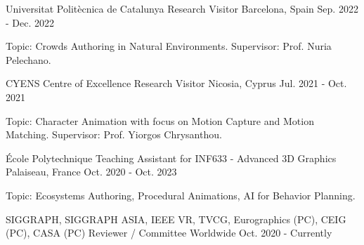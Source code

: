 

\begin{cventries}

\cventry
    {Universitat Politècnica de Catalunya} %
    {Research Visitor} %
    {Barcelona, Spain} %
    {Sep. 2022 - Dec. 2022} %
    {
      \begin{cvitemone} %
        \item {Topic: Crowds Authoring in Natural Environments. Supervisor: Prof. Nuria Pelechano.}
      \end{cvitemone}
    }

  \cventry
    {CYENS Centre of Excellence} %
    {Research Visitor} %
    {Nicosia, Cyprus} %
    {Jul. 2021 - Oct. 2021} %
    {
      \begin{cvitemone} %
        \item {Topic: Character Animation with focus on Motion Capture and Motion Matching. Supervisor: Prof. Yiorgos Chrysanthou.}
      \end{cvitemone}
    }

\cventry
  {École Polytechnique} %
  {Teaching Assistant for INF633 - Advanced 3D Graphics} %
  {Palaiseau, France} %
  {Oct. 2020 - Oct. 2023} %
  {
    \begin{cvitemone} %
      \item {Topic: Ecosystems Authoring, Procedural Animations, AI for Behavior Planning.}
    \end{cvitemone}
  }

\cventry
  {SIGGRAPH, SIGGRAPH ASIA, IEEE VR, TVCG, Eurographics (PC), CEIG (PC), CASA (PC)} %
  {Reviewer / Committee} %
  {Worldwide} %
  {Oct. 2020 - Currently} %
  {}

\end{cventries}
